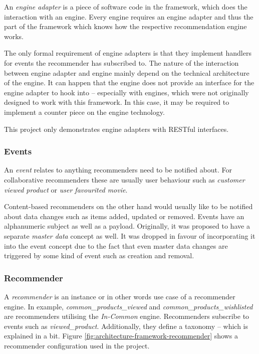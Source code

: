 An \emph{engine adapter} is a piece of software code in the framework, which does the interaction with an engine. Every engine requires an engine adapter and thus the part of the framework which knows how the respective recommendation engine works.

The only formal requirement of engine adapters is that they implement handlers for events the recommender has subscribed to. The nature of the interaction between engine adapter and engine mainly depend on the technical architecture of the engine. It can happen that the engine does not provide an interface for the engine adapter to hook into -- especially with engines, which were not originally designed to work with this framework. In this case, it may be required to implement a counter piece on the engine technology.

This project only demonstrates engine adapters with RESTful interfaces.

\subsubsection{Events}

An \emph{event} relates to anything recommenders need to be notified about. For collaborative recommenders these are usually user behaviour such as \emph{customer viewed product} or \emph{user favourited movie}.

Content-based recommenders on the other hand would usually like to be notified about data changes such as items added, updated or removed. Events have an alphanumeric subject as well as a payload. Originally, it was proposed to have a separate \emph{master data} concept as well. It was dropped in favour of incorporating it into the event concept due to the fact that even master data changes are triggered by some kind of event such as creation and removal.

\subsubsection{Recommender}

A \emph{recommender} is an instance or in other words use case of a recommender engine. In example, \emph{common_products_viewed} and \emph{common_products_wishlisted} are recommenders utilising the \emph{In-Common} engine. Recommenders subscribe to events such as \emph{viewed_product}. Additionally, they define a taxonomy -- which is explained in a bit. Figure \ref{fig:architecture-framework-recommender} shows a recommender configuration used in the project.

